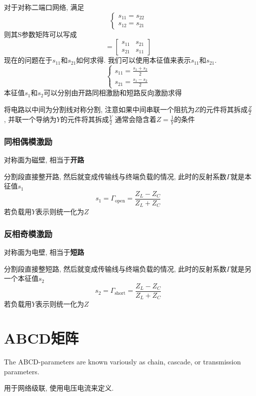 \documentclass[a4paper]{report}
\begin{document}
对于对称二端口网络, 满足
\begin{equation}
  \begin{cases}
    s_{11}=s_{22}
    \\ s_{12}=s_{21}
  \end{cases}
\end{equation}
则其S参数矩阵可以写成
\begin{equation}
  [s]=\begin{bmatrix}
    s_{11}&s_{21}
    \\ s_{21}&s_{11}
  \end{bmatrix}
\end{equation}
现在的问题在于$s_{11}$和$s_{21}$如何求得. 我们可以使用本征值来表示$s_{11}$和$s_{21}$. 
\begin{equation}
  \begin{cases}
    s_{11}=\frac{s_1+s_2}{2}
    \\ s_{21}=\frac{s_1-s_2}{2}
  \end{cases}
\end{equation}
本征值$s_1$和$s_2$可以分别由开路同相激励和短路反向激励求得

将电路以中间为分割线对称分割, 注意如果中间串联一个阻抗为$Z$的元件将其拆成$\frac{Z}{2}$, 并联一个导纳为$Y$的元件将其拆成$\frac{Y}{2}$
通常会隐含着$Z=\frac{1}{Y}$的条件
\subsubsection{同相偶模激励}
对称面为磁壁, 相当于\textbf{开路}

分割段直接整开路, 然后就变成传输线与终端负载的情况, 此时的反射系数$\Gamma$就是本征值$s_1$
$$s_1=\Gamma_{\text{open}}=\frac{Z_L-Z_C}{Z_L+Z_C}$$
若负载用$Y$表示则统一化为$Z$
\subsubsection{反相奇模激励}
对称面为电壁, 相当于\textbf{短路}

分割段直接整短路, 然后就变成传输线与终端负载的情况, 此时的反射系数$\Gamma$就是另一个本征值$s_2$
$$s_2=\Gamma_{\text{short}}=\frac{Z_L-Z_C}{Z_L+Z_C}$$
若负载用$Y$表示则统一化为$Z$

\section{ABCD矩阵}
The ABCD-parameters are known variously as chain, cascade, or transmission parameters.

用于网络级联, 使用电压电流来定义. 
\end{document}
